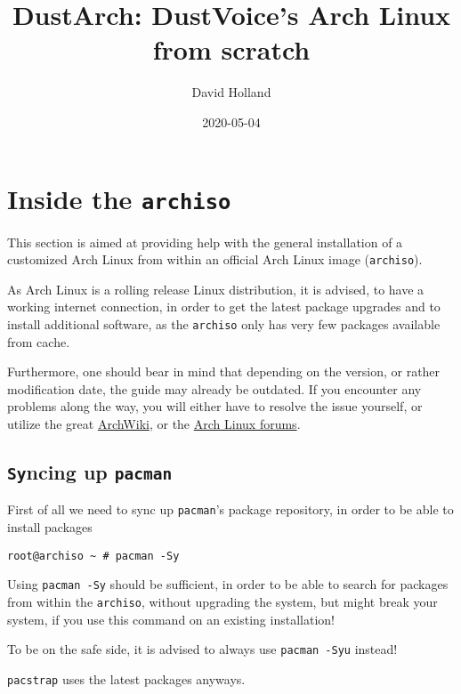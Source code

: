 \documentclass[9pt]{report}
\title{DustArch: DustVoice’s Arch Linux from scratch}
\author{David Holland}
\date{2020-05-04}
\newenvironment{NOTE}
{\begin{tcolorbox}[colback=admonitionBG,coltitle=draculaFG,colframe=draculaBlue,colbacktitle=draculaBlue,title=NOTE]}
{\end{tcolorbox}}
\newenvironment{WARNING}
{\begin{tcolorbox}[colback=admonitionBG,coltitle=draculaBG,colframe=draculaOrange,colbacktitle=draculaOrange,title=WARNING]}
{\end{tcolorbox}}
\begin{document}
\maketitle
\tableofcontents
\hypertarget{x-inside-the-archiso}{\chapter{Inside the \texttt{archiso}}}

This section is aimed at providing help with the general installation of a customized Arch Linux from within an official Arch Linux image (\texttt{archiso}).

\begin{NOTE}
    As Arch Linux is a rolling release Linux distribution, it is advised, to have a working internet connection, in order to get the latest package upgrades and to install additional software, as the \texttt{archiso} only has very few packages available from cache.


    Furthermore, one should bear in mind that depending on the version, or rather modification date, the guide may already be outdated.
    If you encounter any problems along the way, you will either have to resolve the issue yourself, or utilize the great \href{https://wiki.archlinux.org/}{ArchWiki}, or the \href{https://bbs.archlinux.org/}{Arch Linux forums}.
\end{NOTE}

\newpage

\hypertarget{x-syncing-up-pacman}{\section{\texttt{Sy}ncing up \texttt{pacman}}}
First of all we need to sync up \texttt{pacman}'s package repository, in order to be able to install packages


\begin{verbatim}
root@archiso ~ # pacman -Sy
\end{verbatim}

\begin{WARNING}
    Using \texttt{pacman -Sy} should be sufficient, in order to be able to search for packages from within the \texttt{archiso}, without upgrading the system, but might break your system, if you use this command on an existing installation!

    To be on the safe side, it is advised to always use \texttt{pacman -Syu} instead!

    \texttt{pacstrap} uses the latest packages anyways.
\end{WARNING}
\end{document}
